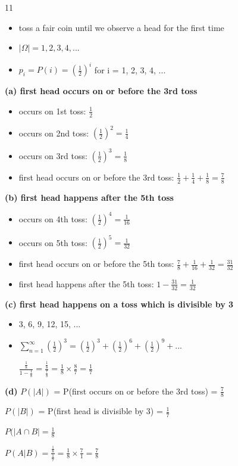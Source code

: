 \documentclass[12 pt]{article}
\begin{document}
    \begin{exercise}{11}
    \hfill

    \begin{itemize}
        \item toss a fair coin until we observe a head for the first time
        \item $| \Omega | = {1, 2, 3, 4, ...}$
        \item $p_i = P({i}) = (\frac{1}{2})^i$ for i = 1, 2, 3, 4, ...
    \end{itemize}

    \textbf{(a) first head occurs on or before the 3rd toss}
    \begin{itemize}
        \item occurs on 1st toss: $\frac{1}{2}$
        \item occurs on 2nd toss: $(\frac{1}{2})^2 = \frac{1}{4}$
        \item occurs on 3rd toss: $(\frac{1}{2})^3  = \frac{1}{8}$
        \item first head occurs on or before the 3rd toss: $\frac{1}{2} + \frac{1}{4} + \frac{1}{8} = \frac{7}{8}$
    \end{itemize}

    \textbf{(b) first head happens after the 5th toss}
    \begin{itemize}
        \item occurs on 4th toss: $(\frac{1}{2})^4 = \frac{1}{16}$
        \item occurs on 5th toss: $(\frac{1}{2})^5 = \frac{1}{32}$
        \item first head occurs on or before the 5th toss: $\frac{7}{8} + \frac{1}{16} + \frac{1}{32} = \frac{31}{32}$
        \item first head happens after the 5th toss: $1 - \frac{31}{32} = \frac{1}{32}$
    \end{itemize}

    \textbf{(c) first head happens on a toss which is divisible by 3}
    \begin{itemize}
        \item 3, 6, 9, 12, 15, ...
        \item $\sum_{n=1}^{\infty} (\frac{1}{2})^3 = (\frac{1}{2})^3 + (\frac{1}{2})^6 + (\frac{1}{2})^9 + ...$

        $\frac{\frac{1}{8}}{1 - \frac{1}{8}} = \frac{\frac{1}{8}}{\frac{7}{8}} = \frac{1}{8} \times \frac{8}{7} = \frac{1}{7}$
    \end{itemize}

    \textbf{(d)} $P(|A|)$ = P(first occurs on or before the 3rd toss) = $\frac{7}{8}$

    $P(|B|)$ = P(first head is divisible by 3) = $\frac{1}{7}$

    $P(|A \cap B| = \frac{1}{8}$

    $P(A|B) = \frac{\frac{1}{8}}{\frac{1}{7}} = \frac{1}{8} \times \frac{7}{1} = \frac{7}{8}$    
    \end{exercise}
\end{document}

